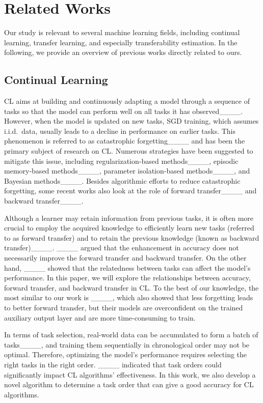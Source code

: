 \section{Related Works}
Our study is relevant to several machine learning fields, including continual learning, transfer learning, and especially transferability estimation. In the following, we provide an overview of previous works directly related to ours.


\subsection{Continual Learning}

CL aims at building and continuously adapting a model through a sequence of tasks so that the model can perform well on all tasks it has observed____. However, when the model is updated on new tasks, SGD training, which assumes i.i.d.~data, usually leads to a decline in performance on earlier tasks. This phenomenon is referred to as catastrophic forgetting____ and has been the primary subject of research on CL. Numerous strategies have been suggested to mitigate this issue, including regularization-based methods____, episodic memory-based methods____, parameter isolation-based methods____, and Bayesian methods____. Besides algorithmic efforts to reduce catastrophic forgetting, some recent works also look at the role of forward transfer____ and backward transfer____.

Although a learner may retain information from previous tasks, it is often more crucial to employ the acquired knowledge to efficiently learn new tasks (referred to as forward transfer) and to retain the previous knowledge (known as backward transfer)____. ____ argued that the enhancement in accuracy does not necessarily improve the forward transfer and backward transfer. On the other hand, ____ showed that the relatedness between tasks can affect the model's performance. In this paper, we will explore the relationships between accuracy, forward transfer, and backward transfer in CL. To the best of our knowledge, the most similar to our work is ____, which also showed that less forgetting leads to better forward transfer, but their models are overconfident on the trained auxiliary output layer and are more time-consuming to train.

In terms of task selection, real-world data can be accumulated to form a batch of tasks____, and training them sequentially in chronological order may not be optimal. Therefore, optimizing the model's performance requires selecting the right tasks in the right order. ____ indicated that task orders could significantly impact CL algorithms' effectiveness. In this work, we also develop a novel algorithm to determine a task order that can give a good accuracy for CL algorithms.


